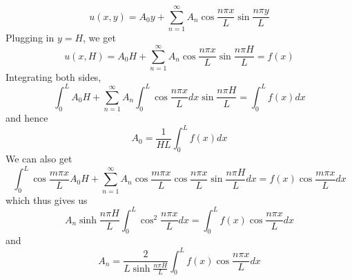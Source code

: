\documentclass[11pt]{article}
\theoremstyle{mystyle}
\theoremstyle{definition}
\begin{document}
\[
  u(x,y) = A_0y + \sum_{n=1}^\infty A_n \cos \displaystyle\frac{n\pi x}{L} \sin \displaystyle\frac{n\pi y}{L} 
\]
Plugging in $y = H$, we get 
\[
  u(x,H) = A_0H + \sum_{n=1}^\infty A_n \cos \displaystyle\frac{n\pi x}{L} \sin \displaystyle\frac{n\pi H}{L} = f(x) 
\]
Integrating both sides, 
\[
  \int_0^L A_0H + \sum_{n=1}^\infty A_n \int_0^L \cos \displaystyle\frac{n\pi x}{L} dx \sin \displaystyle\frac{n\pi H}{L} = \int_0^L f(x) dx
\]
and hence 
\[
  A_0 = \displaystyle\frac{1}{HL} \int_0^L f(x) dx
\]
We can also get 
\[
  \int_0^L \cos \displaystyle\frac{m\pi x}{L}A_0H + \sum_{n=1}^\infty A_n \cos \displaystyle\frac{m\pi x}{L} \cos \displaystyle\frac{n\pi x}{L} \sin \displaystyle\frac{n\pi H}{L} dx= f(x) \cos \displaystyle\frac{m\pi x}{L} dx 
\]
which thus gives us 
\[
  A_n \sinh \displaystyle\frac{n\pi H}{L} \int_0^L \cos^2 \displaystyle\frac{n\pi x }{L} dx = \int_0^L f(x) \cos\displaystyle\frac{n\pi x }{L} dx 
\]
and 
\[
  A_n = \displaystyle\frac{2}{L \sinh \displaystyle\frac{n\pi H}{L}} \int_0^L f(x) \cos \displaystyle\frac{n\pi x }{L} dx 
\]
\newpage
\end{document}
